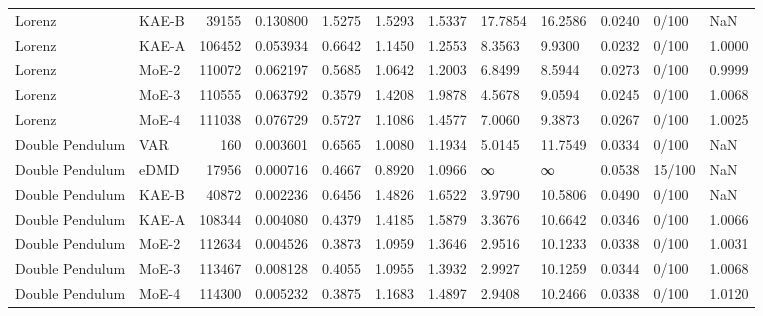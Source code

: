 \begin{tabular}{llrlllllllll}
Lorenz & KAE-B & 39155 & 0.130800 & 1.5275 & 1.5293 & 1.5337 & 17.7854 & 16.2586 & 0.0240 & 0/100 & NaN \\
Lorenz & KAE-A & 106452 & 0.053934 & 0.6642 & 1.1450 & 1.2553 & 8.3563 & 9.9300 & 0.0232 & 0/100 & 1.0000 \\
Lorenz & MoE-2 & 110072 & 0.062197 & 0.5685 & 1.0642 & 1.2003 & 6.8499 & 8.5944 & 0.0273 & 0/100 & 0.9999 \\
Lorenz & MoE-3 & 110555 & 0.063792 & 0.3579 & 1.4208 & 1.9878 & 4.5678 & 9.0594 & 0.0245 & 0/100 & 1.0068 \\
Lorenz & MoE-4 & 111038 & 0.076729 & 0.5727 & 1.1086 & 1.4577 & 7.0060 & 9.3873 & 0.0267 & 0/100 & 1.0025 \\
Double Pendulum & VAR & 160 & 0.003601 & 0.6565 & 1.0080 & 1.1934 & 5.0145 & 11.7549 & 0.0334 & 0/100 & NaN \\
Double Pendulum & eDMD & 17956 & 0.000716 & 0.4667 & 0.8920 & 1.0966 & ∞ & ∞ & 0.0538 & 15/100 & NaN \\
Double Pendulum & KAE-B & 40872 & 0.002236 & 0.6456 & 1.4826 & 1.6522 & 3.9790 & 10.5806 & 0.0490 & 0/100 & NaN \\
Double Pendulum & KAE-A & 108344 & 0.004080 & 0.4379 & 1.4185 & 1.5879 & 3.3676 & 10.6642 & 0.0346 & 0/100 & 1.0066 \\
Double Pendulum & MoE-2 & 112634 & 0.004526 & 0.3873 & 1.0959 & 1.3646 & 2.9516 & 10.1233 & 0.0338 & 0/100 & 1.0031 \\
Double Pendulum & MoE-3 & 113467 & 0.008128 & 0.4055 & 1.0955 & 1.3932 & 2.9927 & 10.1259 & 0.0344 & 0/100 & 1.0068 \\
Double Pendulum & MoE-4 & 114300 & 0.005232 & 0.3875 & 1.1683 & 1.4897 & 2.9408 & 10.2466 & 0.0338 & 0/100 & 1.0120 \\
\bottomrule
\end{tabular}
